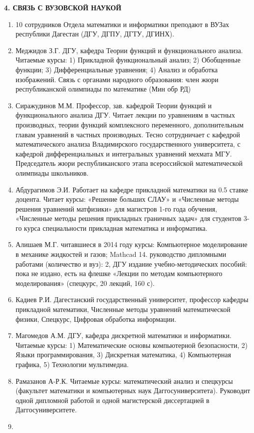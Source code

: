 \noindent \eject

\noindent \textbf{4. СВЯЗЬ С ВУЗОВСКОЙ НАУКОЙ}

\begin{enumerate}
\item  10 сотрудников Отдела математики и информатики преподают в ВУЗах республики Дагестан (ДГУ, ДГПУ, ДГТУ, ДГИНХ).

\item  Меджидов З.Г. ДГУ, кафедра Теории функций и функционального анализа. Читаемые курсы: 1) Прикладной функциональный анализ; 2) Обобщенные функции; 3) Дифференциальные уравнения; 4) Анализ и обработка изображений. Связь с органами народного образования: член жюри республиканской олимпиады по математике (Мин обр РД)

\item  Сиражудинов М.М. Профессор, зав. кафедрой Теории функций и функционального анализа ДГУ. Читает лекции по уравнениям в частных производных, теории функций комплексного переменного, дополнительным главам уравнений в частных производных. Тесно сотрудничает с кафедрой математического анализа Владимирского государственного университета, с кафедрой дифференциальных и интегральных уравнений мехмата МГУ. Председатель жюри республиканского этапа всероссийской математической олимпиады школьников.

\item  Абдурагимов Э.И. Работает на кафедре прикладной математики на 0.5 ставке доцента. Читает курсы: «Решение больших СЛАУ»  и «Численные методы решения уравнений матфизики» для магистров 1-го года обучения, «Численные методы решения прикладных граничных задач» для студентов 3-го курса специальности прикладная математика и информатика.

\item  Алишаев М.Г. читавшиеся в 2014 году курсы: Компьютерное моделирование в механике жидкостей и газов; Mathcad 14. руководство дипломными работами (количество и вуз): 2, ДГУ издание учебно-методических пособий: пока не издано, есть на  флешке «Лекции по методам компьютерного моделирования» (спецкурс, 20 лекций, 160 с).

\item  Кадиев Р.И. Дагестанский государственный университет, профессор кафедры прикладной математики, Численные методы уравнений математической физики, Спецкурс, Цифровая обработка информации.

\item  Магомедов А.М. ДГУ, кафедра дискретной математики и информатики. Читаемые курсы: 1) Математические основы компьютерной безопасности, 2) Языки программирования, 3) Дискретная математика, 4) Компьютерная графика, 5) Технологии мультимедиа.

\item  Рамазанов А-Р.К. Читаемые курсы: математический анализ и спецкурсы (факультет математики и компьютерных наук  Даггосуниверситета). Руководит одной дипломной работой и одной магистерской диссертацией в Даггосуниверситете.

\item
\end{enumerate}

